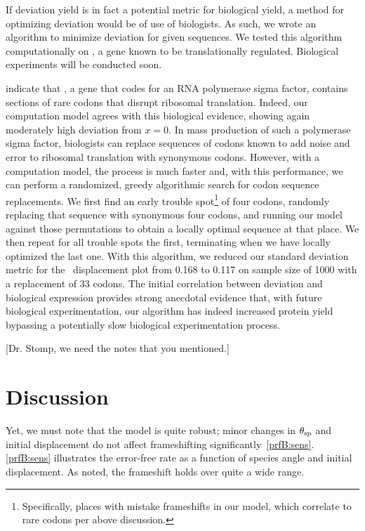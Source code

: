 \documentclass[12pt, draft]{article}
\numberwithin{equation}{section}
\begin{document}
If deviation yield is in fact a potential metric for biological yield,
a method for optimizing deviation would be of use of biologists.  As such,
we wrote an algorithm to minimize deviation for given sequences.
We tested this algorithm computationally on \rpoS, a gene known to
be translationally regulated.  Biological experiments will be
conducted soon.


\citet{rpoS:process} indicate that \rpoS, a gene that codes for an RNA
polymerase sigma factor, contains sections of rare codons that disrupt
ribosomal translation. Indeed, our computation model agrees with this
biological evidence, showing again moderately high deviation from $x =
0$. In mass production of such a polymerase sigma factor, biologists
can replace sequences of codons known to add noise and error to
ribosomal translation with synonymous codons. 
However, with a computation model, the process is much
faster and, with this performance, we can perform a randomized, greedy
algorithmic search for codon sequence replacements. We first find an
early trouble spot\footnote{Specifically, places with
  mistake frameshifts in our model, which correlate to rare codons per
  above discussion.} of four codons, randomly replacing that sequence
with synonymous four codons, and running our model against those
permutations to obtain a locally optimal sequence at that place. We
then repeat for all trouble spots the first, terminating when we have locally
optimized the last one. With this algorithm, we reduced our standard
deviation metric for the \rpoS\ displacement plot from 0.168 to 0.117
on sample size of 1000 with a replacement of 33 codons. The
initial correlation between deviation and biological expression
provides strong anecdotal evidence that, with future biological
experimentation, our algorithm has indeed increased protein yield
bypassing a potentially slow biological experimentation process.

[Dr. Stomp, we need the notes that you mentioned.]

\section{Discussion}
Yet, we must note that the model is quite robust; minor changes
in $\theta_{\rm{sp}}$ and initial displacement do not affect frameshifting significantly~\autoref{prfB:sens}.
\autoref{prfB:sens} illustrates the error-free rate as
a function of species angle and initial displacement. As noted,
the frameshift holds over quite a wide range.
\end{document}
